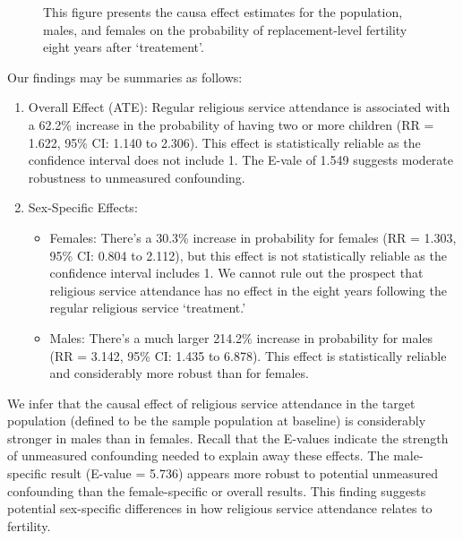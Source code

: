 \documentclass[
  single column]{article}
\providecommand{\tightlist}{%
  \setlength{\itemsep}{0pt}\setlength{\parskip}{0pt}}\usepackage{longtable,booktabs,array}
\begin{document}
\newpage{}

\begin{figure}


\caption{\label{fig-1_1}This figure presents the causa effect estimates
for the population, males, and females on the probability of
replacement-level fertility eight years after `treatement'.}

\end{figure}%

\newpage{}

Our findings may be summaries as follows:

\begin{enumerate}
\def\labelenumi{\arabic{enumi}.}
\item
  Overall Effect (ATE): Regular religious service attendance is
  associated with a 62.2\% increase in the probability of having two or
  more children (RR = 1.622, 95\% CI: 1.140 to 2.306). This effect is
  statistically reliable as the confidence interval does not include 1.
  The E-vale of 1.549 suggests moderate robustness to unmeasured
  confounding.
\item
  Sex-Specific Effects:

  \begin{itemize}
  \tightlist
  \item
    Females: There's a 30.3\% increase in probability for females (RR =
    1.303, 95\% CI: 0.804 to 2.112), but this effect is not
    statistically reliable as the confidence interval includes 1. We
    cannot rule out the prospect that religious service attendance has
    no effect in the eight years following the regular religious service
    `treatment.'
  \item
    Males: There's a much larger 214.2\% increase in probability for
    males (RR = 3.142, 95\% CI: 1.435 to 6.878). This effect is
    statistically reliable and considerably more robust than for
    females.
  \end{itemize}
\end{enumerate}

We infer that the causal effect of religious service attendance in the
target population (defined to be the sample population at baseline) is
considerably stronger in males than in females. Recall that the E-values
indicate the strength of unmeasured confounding needed to explain away
these effects. The male-specific result (E-value = 5.736) appears more
robust to potential unmeasured confounding than the female-specific or
overall results. This finding suggests potential sex-specific
differences in how religious service attendance relates to fertility.
\end{document}
